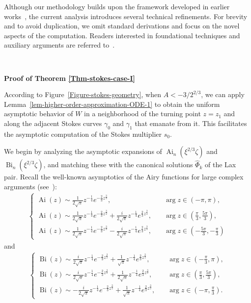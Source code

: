 \documentclass[12pt]{article}
\theoremstyle{plain}
\theoremstyle{definition}
\numberwithin{equation}{section}
\newcommand\Ai{\operatorname{Ai}}
\newcommand\Bi{\operatorname{Bi}}
\begin{document}
Although our methodology builds upon the framework developed in earlier works~\cite{Long-Jiang-Li, LongLi, LongLiWang}, the current analysis introduces several technical refinements.
For brevity and to avoid duplication, we omit standard derivations and focus on the novel aspects of the computation. Readers interested in foundational techniques and auxiliary arguments are referred to~\cite{Long-Jiang-Li, LongLi, LongLiWang}.


\

\textbf{Proof of Theorem \ref{Thm-stokes-case-I}}

According to Figure~\ref{Figure-stokes-geometry}, when $A < -3/2^{2/3}$, we can apply Lemma~\ref{lem-higher-order-approximation-ODE-1} to obtain the uniform asymptotic behavior of $W$ in a neighborhood of the turning point $z = z_1$ and along the adjacent Stokes curves $\gamma_0$ and $\gamma_1$ that emanate from it. This facilitates the asymptotic computation of the Stokes multiplier $s_0$.

We begin by analyzing the asymptotic expansions of $\Ai_n(\xi^{2/3}\zeta)$ and $\Bi_n(\xi^{2/3}\zeta)$, and matching these with the canonical solutions $\widehat{\Phi}_k$ of the Lax pair. Recall the well-known asymptotics of the Airy functions for large complex arguments (see~\cite[Eqs.~(9.2.12), (9.7.5), (9.2.10)]{NIST-handbook}):
\begin{eqnarray}\label{eq-asym-Ai}
\begin{cases}
\Ai(z)\sim
\frac{1}{2\sqrt{\pi}}z^{-\frac{1}{4}}e^{-\frac{2}{3}z^{\frac{3}{2}}},
\quad & \arg{z}\in(-\pi,\pi),\\
\Ai(z)\sim
\frac{1}{2\sqrt{\pi}}z^{-\frac{1}{4}}e^{-\frac{2}{3}z^{\frac{3}{2}}}
+\frac{i}{2\sqrt{\pi}}z^{-\frac{1}{4}}e^{\frac{2}{3}z^{\frac{3}{2}}},
\quad & \arg{z}\in\left(\frac{\pi}{3},\frac{5\pi}{3}\right),\\
\Ai(z)\sim
\frac{1}{2\sqrt{\pi}}z^{-\frac{1}{4}}e^{-\frac{2}{3}z^{\frac{3}{2}}}
-\frac{i}{2\sqrt{\pi}}z^{-\frac{1}{4}}e^{\frac{2}{3}z^{\frac{3}{2}}},
\quad &\arg{z}\in\left(-\frac{5\pi}{3},-\frac{\pi}{3}\right)
\end{cases}
\end{eqnarray}
and
\begin{eqnarray}\label{eq-asym-Bi}
\begin{cases}
\Bi(z)\sim
\frac{i}{2\sqrt{\pi}}z^{-\frac{1}{4}}e^{-\frac{2}{3}z^{\frac{3}{2}}}
+\frac{1}{\sqrt{\pi}}z^{-\frac{1}{4}}e^{\frac{2}{3}z^{\frac{3}{2}}},
\quad&\arg{z}\in\left(-\frac{\pi}{3},\pi\right),\\
\Bi(z)\sim
\frac{i}{2\sqrt{\pi}}z^{-\frac{1}{4}}e^{-\frac{2}{3}z^{\frac{3}{2}}}
+\frac{1}{2\sqrt{\pi}}z^{-\frac{1}{4}}e^{\frac{2}{3}z^{\frac{3}{2}}},
\quad & \arg{z}\in\left(\frac{\pi}{3},\frac{5\pi}{3}\right),\\
\Bi(z)\sim
-\frac{i}{2\sqrt{\pi}}z^{-\frac{1}{4}}e^{-\frac{2}{3}z^{\frac{3}{2}}}
+\frac{1}{\sqrt{\pi}}z^{-\frac{1}{4}}e^{\frac{2}{3}z^{\frac{3}{2}}},
\quad & \arg{z}\in\left(-\pi,\frac{\pi}{3}\right).
\end{cases}
\end{eqnarray}
\end{document}
